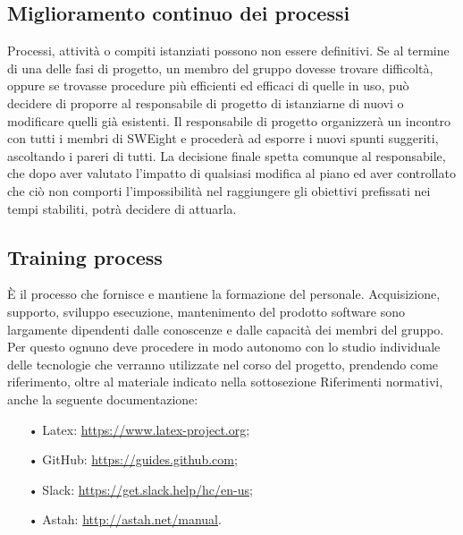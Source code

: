 \subsection{Miglioramento continuo dei processi}
Processi, attività o compiti istanziati possono non essere definitivi. Se al termine di una delle fasi di progetto, un membro del gruppo dovesse trovare difficoltà, oppure se trovasse procedure più efficienti ed efficaci di quelle in uso, può decidere di proporre al responsabile di progetto di istanziarne di nuovi o modificare quelli già esistenti.  
\newline
Il responsabile di progetto organizzerà un incontro con tutti i membri di SWEight e procederà ad esporre i nuovi spunti suggeriti, ascoltando i pareri di tutti. 
\newline
La decisione finale spetta comunque al responsabile, che dopo aver valutato l'impatto di qualsiasi modifica al piano ed aver controllato che ciò non comporti l'impossibilità nel raggiungere gli obiettivi prefissati nei tempi stabiliti, potrà decidere di attuarla.

\subsection{Training process}È il processo che fornisce e mantiene la formazione del personale. Acquisizione, supporto, sviluppo esecuzione, mantenimento del prodotto software sono largamente dipendenti dalle conoscenze e dalle capacità dei membri del gruppo. 
\newline
Per questo ognuno deve procedere in modo autonomo con lo studio individuale delle tecnologie che verranno utilizzate nel corso del progetto, prendendo come riferimento, oltre al materiale indicato nella sottosezione Riferimenti normativi, anche la seguente documentazione:
\begin{itemize}
\item[•] Latex: \url{https://www.latex-project.org};
\item[•] GitHub: \url{https://guides.github.com};
\item[•] Slack: \url{https://get.slack.help/hc/en-us};
\item[•] Astah: \url{http://astah.net/manual}.
\end{itemize}